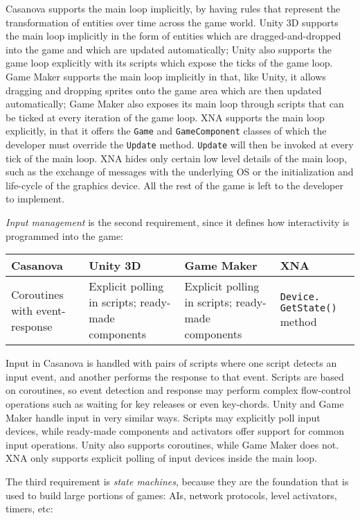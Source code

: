Casanova supports the main loop implicitly, by having rules that represent the transformation of entities over time across the game world.
Unity 3D supports the main loop implicitly in the form of entities which are dragged-and-dropped into the game and which are updated automatically; Unity also supports the game loop explicitly with its scripts which expose the ticks of the game loop. Game Maker supports the main loop implicitly in that, like Unity, it allows dragging and dropping sprites onto the game area which are then updated automatically; Game Maker also exposes its main loop through scripts that can be ticked at every iteration of the game loop.
XNA supports the main loop explicitly, in that it offers the \texttt{Game} and \texttt{GameComponent} classes of which the developer must override the \texttt{Update} method. \texttt{Update} will then be invoked at every tick of the main loop. XNA hides only certain low level details of the main loop, such as the exchange of messages with the underlying OS or the initialization and life-cycle of the graphics device. All the rest of the game is left to the developer to implement.


\textit{Input management} is the second requirement, since it defines how interactivity is programmed into the game:

\begin{tabular}{ | p{2.8cm} | p{2.8cm} | p{2.8cm} | p{2.8cm} | }
\hline
Casanova & Unity 3D & Game Maker & XNA \\
\hline
Coroutines with event-response & Explicit polling in scripts; ready-made components & Explicit polling in scripts; ready-made components & \texttt{Device.} \texttt{GetState()} method \\
\hline
\end{tabular}

Input in Casanova is handled with pairs of scripts where one script detects an input event, and another performs the response to that event. Scripts are based on coroutines, so event detection and response may perform complex flow-control operations such as waiting for key releases or even key-chords.
Unity and Game Maker handle input in very similar ways. Scripts may explicitly poll input devices, while ready-made components and activators offer support for common input operations. Unity also supports coroutines, while Game Maker does not.
XNA only supports explicit polling of input devices inside the main loop.


The third requirement is \textit{state machines}, because they are the foundation that is used to build large portions of games: AIs, network protocols, level activators, timers, etc:

